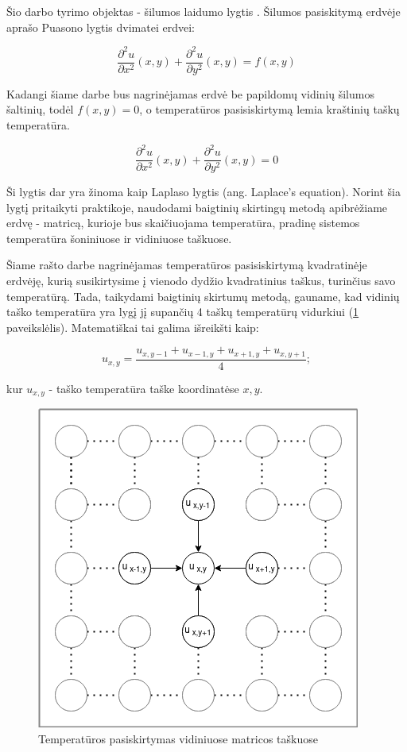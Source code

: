 \documentclass{VUMIFPSbakalaurinis}
\begin{document}
Šio darbo tyrimo objektas - šilumos laidumo lygtis \cite{burden2011numerical}. 
Šilumos pasiskitymą erdvėje aprašo Puasono lygtis dvimatei erdvei:

\[ \frac{∂^2 u}{∂ x^2}(x,y)+\frac{∂^2 u}{∂ y^2}(x,y) = f(x,y) \]

Kadangi šiame darbe bus nagrinėjamas erdvė be papildomų vidinių šilumos šaltinių, todėl $f(x,y) = 0 $, o temperatūros pasisiskirtymą lemia kraštinių taškų temperatūra.

\[ \frac{∂^2 u}{∂ x^2}(x,y)+\frac{∂^2 u}{∂ y^2}(x,y) = 0 \]

Ši lygtis dar yra žinoma kaip Laplaso lygtis (ang. Laplace's equation).
Norint šia lygtį pritaikyti praktikoje, naudodami baigtinių skirtingų metodą apibrėžiame erdvę - matricą, kurioje bus skaičiuojama temperatūra, pradinę sistemos temperatūra šoniniuose ir vidiniuose taškuose.

Šiame rašto darbe nagrinėjamas temperatūros pasisiskirtymą kvadratinėje erdvėję, kurią susikirtysime į vienodo dydžio kvadratinius taškus, turinčius savo temperatūrą.
Tada, taikydami baigtinių skirtumų metodą, gauname, kad vidinių taško temperatūra yra lygį jį supančių 4 taškų temperatūrų vidurkiui (\ref{img:5point} paveikslėlis). 
Matematiškai tai galima išreikšti kaip:

\[ u_{x, y} = \frac{u_{x,y-1}+u_{x-1,y}+u_{x+1,y}+u_{x,y+1}}{4} ;\]

kur $u_{x,y}$ - taško temperatūra taške koordinatėse $x,y$.  

\begin{figure}[H]
    \centering
    \includegraphics[scale=0.7]{img/5point.png}
    \caption{Temperatūros pasiskirtymas vidiniuose matricos taškuose}
    \label{img:5point}
\end{figure}
\end{document}
